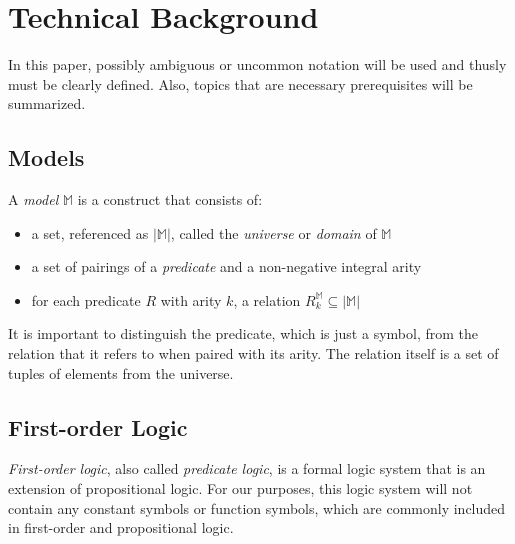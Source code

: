 \section{Technical Background}

	In this paper, possibly ambiguous or uncommon notation will be used and
	thusly must be clearly defined.  Also, topics that are necessary
	prerequisites will be summarized.

	\subsection{Models}

		A \emph{model} $\mathbb{M}$ is a construct that consists of:
		\begin{itemize}
		\item a set, referenced as $|\mathbb{M}|$, called the \emph{universe} or \emph{domain} of $\mathbb{M}$
		\item a set of pairings of a \emph{predicate} and a non-negative integral arity
		\item for each predicate $R$ with arity $k$, a relation $R^\mathbb{M}_k \subseteq |\mathbb{M}|$
		\end{itemize}
		It is important to distinguish the predicate, which is just a symbol,
		from the relation that it refers to when paired with its arity. The
		relation itself is a set of tuples of elements from the universe.

	\subsection{First-order Logic}

		\emph{First-order logic}, also called \emph{predicate logic}, is a
		formal logic system that is an extension of propositional logic. For
		our purposes, this logic system will not contain any constant symbols
		or function symbols, which are commonly included in first-order and
		propositional logic.

